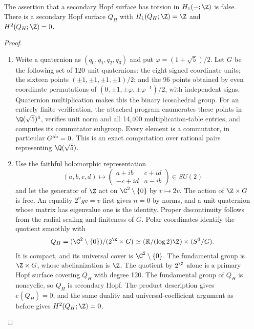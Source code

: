 \begin{proposition}\hypertarget{tag-01F9}{}\label{cdp:st:C.3.3}


The assertion that a secondary Hopf surface has torsion in
$H_1(-;\Z)$ is false. There is a secondary Hopf surface $Q_H$ with
$H_1(Q_H;\Z)=\Z$ and $H^2(Q_H;\Z)=0$.
\end{proposition}


\begin{proof}

\begin{enumerate}[label={$\langle1\rangle$\arabic*.},leftmargin=*]
\item Write a quaternion as $(q_0,q_1,q_2,q_3)$ and put
$\varphi=(1+\sqrt5)/2$. Let $G$ be the following set of 120 unit
quaternions: the eight signed coordinate units; the sixteen points
$(\pm1,\pm1,\pm1,\pm1)/2$; and the 96 points obtained by even
coordinate permutations of
$(0,\pm1,\pm\varphi,\pm\varphi^{-1})/2$, with independent signs.
Quaternion multiplication makes this the binary icosahedral group.
For an entirely finite verification, the attached program enumerates
these points in $\Q(\sqrt5)^4$, verifies unit norm and all 14,400
multiplication-table entries, and computes its commutator subgroup.
Every element is a commutator, in particular $G^{\rm ab}=0$.
This is an exact computation over rational pairs representing
$\Q(\sqrt5)$.

\item Use the faithful holomorphic representation
\[
(a,b,c,d)\longmapsto
\begin{pmatrix}a+ib&c+id\\-c+id&a-ib\end{pmatrix}\in SU(2)
\]
and let the generator of $\Z$ act on $\C^2\setminus\{0\}$ by
$v\mapsto2v$. The action of $\Z\times G$ is free. An equality
$2^ngv=v$ first gives $n=0$ by norms, and a unit quaternion whose
matrix has eigenvalue one is the identity. Proper discontinuity
follows from the radial scaling and finiteness of $G$.
Polar coordinates identify the quotient smoothly with
\[
Q_H=(\C^2\setminus\{0\})/(2^{\Z}\times G)
\simeq (\mathbb R/(\log2)\Z)\times(S^3/G).
\]
It is compact, and its universal cover is $\C^2\setminus\{0\}$.
The fundamental group is $\Z\times G$, whose abelianization is
$\Z$. The quotient by $2^{\Z}$ alone is a primary Hopf surface
covering $Q_H$ with degree 120. The fundamental group of $Q_H$ is
noncyclic, so $Q_H$ is secondary Hopf. The product description gives
$e(Q_H)=0$, and the same duality and universal-coefficient argument
as before gives $H^2(Q_H;\Z)=0$.

\end{enumerate}
\end{proof}